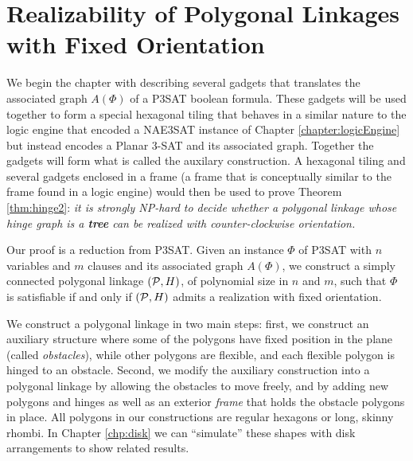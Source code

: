 \chapter{Realizability of Polygonal Linkages with Fixed Orientation\label{chapter:polygonalLinkage}}

We begin the chapter with describing several gadgets that translates the associated graph $A(\Phi)$ of a P3SAT boolean formula.  
These gadgets will be used together to form a special hexagonal tiling that behaves in a similar nature to the logic engine that encoded a NAE3SAT instance of Chapter \ref{chapter:logicEngine} but instead encodes a Planar 3-SAT and its associated graph.
Together the gadgets will form what is called the auxilary construction.
A hexagonal tiling and several gadgets enclosed in a frame (a frame that is conceptually similar to the frame found in a logic engine) would then be used to prove Theorem \ref{thm:hinge2}: \textit{it is strongly NP-hard to decide whether a polygonal linkage whose hinge graph is a \textbf{tree} can be realized with counter-clockwise orientation.}

Our proof is a reduction from P3SAT.
Given an instance $\Phi$ of P3SAT with $n$ variables and $m$ clauses and its associated graph $A(\Phi)$, we construct a simply connected polygonal linkage $({\cal P},H)$, of polynomial size in $n$ and $m$, such that $\Phi$ is satisfiable if and only if $({\cal P},H)$ admits a realization with fixed orientation. 

We construct a polygonal linkage in two main steps: first, we construct an auxiliary structure where some of the polygons have fixed position in the plane (called \emph{obstacles}), while other polygons are flexible, and each flexible polygon is hinged to an obstacle. 
Second, we modify the auxiliary construction into a polygonal linkage by allowing the obstacles to move freely, and by adding new polygons and hinges as well as an exterior \emph{frame} that holds the obstacle polygons in place.
All polygons in our constructions are regular hexagons or long, skinny rhombi.
In Chapter \ref{chp:disk} we can ``simulate'' these shapes with disk arrangements to show related results.

